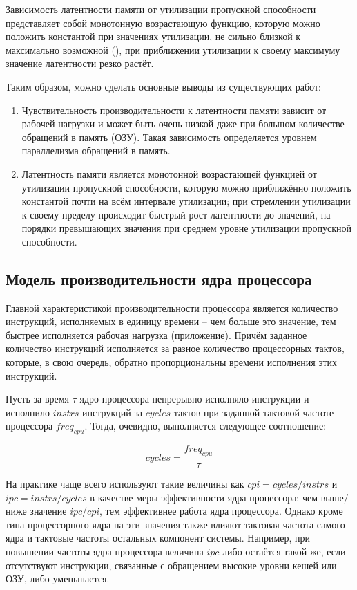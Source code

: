     Зависимость латентности памяти от утилизации пропускной способности представляет собой монотонную
    возрастающую функцию, которую можно положить константой при значениях утилизации, не сильно близкой
    к максимально возможной (\cite{david2011memory}), при приближении утилизации к своему максимуму
    значение латентности резко растёт.

    Таким образом, можно сделать основные выводы из существующих работ:
    \begin{enumerate}
        \item Чувствительность производительности к латентности памяти зависит от рабочей нагрузки и может
        быть очень низкой даже при большом количестве обращений в память (ОЗУ). Такая зависимость
        определяется уровнем параллелизма обращений в память.
        \item Латентность памяти является монотонной возрастающей функцией от утилизации пропускной
        способности, которую можно приближённо положить константой почти на всём интервале утилизации;
        при стремлении утилизации к своему пределу происходит быстрый рост латентности до значений,
        на порядки превышающих значения при среднем уровне утилизации пропускной способности.
    \end{enumerate}

\subsection{Модель производительности ядра процессора} \label{model_chapter}

    Главной характеристикой производительности процессора является количество инструкций,
    исполняемых в единицу времени -- чем больше это значение, тем быстрее исполняется рабочая
    нагрузка (приложение). Причём заданное количество инструкций исполняется за разное количество
    процессорных тактов, которые, в свою очередь, обратно пропорциональны времени исполнения
    этих инструкций.

    Пусть за время $\tau$ ядро процессора непрерывно исполняло инструкции и исполнило $instrs$
    инструкций за $cycles$ тактов при заданной тактовой частоте процессора $freq_{cpu}$.
    Тогда, очевидно, выполняется следующее соотношение:

    \begin{equation} \label{cycles_base}
        cycles = \frac{freq_{cpu}}{\tau}
    \end{equation}

    На практике чаще всего используют такие величины как $cpi = cycles / instrs$ и
    $ipc = instrs / cycles$ в качестве меры эффективности ядра процессора: чем выше/ниже значение
    $ipc$/$cpi$, тем эффективнее работа ядра процессора. Однако кроме типа процессорного ядра
    на эти значения также влияют тактовая частота самого ядра и тактовые частоты остальных компонент
    системы. Например, при повышении частоты ядра процессора величина $ipc$ либо остаётся такой же,
    если отсутствуют инструкции, связанные с обращением высокие уровни кешей или ОЗУ, либо уменьшается.

